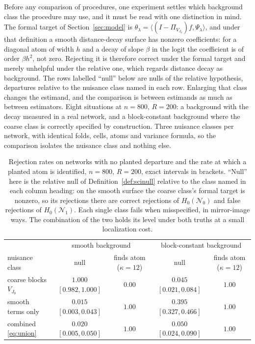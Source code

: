 \documentclass[11pt]{article}
\theoremstyle{definition}
\newcommand{\1}{\mathbf 1}\newcommand{\op}{\operatorname}
\begin{document}
Before any comparison of procedures, one experiment settles which background
class the procedure may use, and it must be read with one distinction in mind.
The formal target of Section~\ref{sec:model} is
$\theta_\lambda=\langle(I-\Pi_{V_{J_0}})f,\Psi_\lambda\rangle$, and under that
definition a smooth distance-decay surface has nonzero coefficients: for a
diagonal atom of width $h$ and a decay of slope $\beta$ in the logit the
coefficient is of order $\beta h^2$, not zero.  Rejecting it is therefore
correct under the formal target and merely unhelpful under the relative one,
which regards distance decay as background.  The rows labelled ``null'' below
are nulls of the relative hypothesis, departures relative to the
nuisance class named in each row.  Enlarging that class changes the estimand,
and the comparison is between estimands as much as between estimators.  Eight situations at $n=800$, $R=200$: a background
with the decay measured in a real network, and a block-constant background where
the coarse class is correctly specified by construction.  Three nuisance classes per
network, with identical folds, cells, atoms and variance formula, so the
comparison isolates the nuisance class and nothing else.

\begin{table}[t]\centering
\caption{Rejection rates on networks with no planted departure and the rate at
which a planted atom is identified, $n=800$, $R=200$, exact intervals in
brackets.  ``Null'' here is the relative null of Definition~\ref{def:scinull}
relative to the class named in each column heading: on the smooth surface the
coarse class's formal target is nonzero, so its rejections there are correct
rejections of $H_0(\mathcal N_0)$ and false rejections of $H_0(\mathcal N_1)$.  Each
single class fails when misspecified, in mirror-image ways.  The combination of the two
holds its level under both truths at a small localization cost.}
                                                          \label{tab:nuisance}
\begin{tabular}{lcccc}
\hline
 & \multicolumn{2}{c}{smooth background} & \multicolumn{2}{c}{block-constant background}\\
nuisance class & null & finds atom ($\kappa{=}12$) & null & finds atom ($\kappa{=}12$)\\
\hline
coarse blocks $V_{J_0}$ & $1.000$ $[0.982,1.000]$ & $0.00$ & $0.045$ $[0.021,0.084]$ & $1.00$\\
smooth terms only       & $0.015$ $[0.003,0.043]$ & $1.00$ & $0.395$ $[0.327,0.466]$ & $1.00$\\
combined \eqref{eq:union} & $0.020$ $[0.005,0.050]$ & $1.00$ & $0.050$ $[0.024,0.090]$ & $1.00$\\
\hline
\end{tabular}
\end{table}
\end{document}
